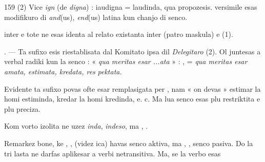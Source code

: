 \begin{VUpage}[163]{159}
{(2) Vice \textit{ign} (de \textit{digna}) : iaudigna = laudinda, qua propozesis.\nl
{} versimile esas modifikuro di \textit{and}(us), \textit{end}(us) latina kun\nl
chanjo di senco.%
}

\VUcontinue
inter  e  tote ne esas identa al relato existanta inter\nl
{} (patro maskula) e  (1).

. --- Ta sufixo esis riestablisata dal Komitato ipsa\nl
dil \textit{Delegitaro} (2). Ol juntesas a verbal radiki kun la senco :\nl
« \textit{qua meritas esar ...ata} » : ,\nl
{} = \textit{qua meritas esar amata, estimata, kredata, res}\cc
\textit{pektata.}

Evidente ta sufixo povas ofte esar remplasigata per ,\nl
nam « on devas » estimar la homi estiminda, kredar la\nl
homi kredinda, e. c. Ma lua senco esas plu restriktita e plu\nl
preciza.

Kom vorto izolita ne uzez \textit{inda}, \textit{indeso}, ma , .\parplein

Remarkez bone, ke , ,  (videz ica) havas senco\nl
aktiva, ma , ,  senco pasiva. Do la tri lasta ne\nl
darfas aplikesar a verbi netransitiva. Ma, se la verbo esas\parplein
\end{VUpage}


